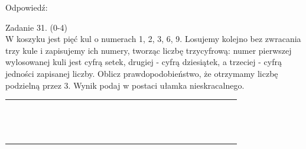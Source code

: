 \documentclass[10pt]{article}
\begin{document}
Odpowiedź:

Zadanie 31. (0-4)\\
W koszyku jest pięć kul o numerach 1, 2, 3, 6, 9. Losujemy kolejno bez zwracania trzy kule i zapisujemy ich numery, tworząc liczbę trzycyfrową: numer pierwszej wylosowanej kuli jest cyfrą setek, drugiej - cyfrą dziesiątek, a trzeciej - cyfrą jedności zapisanej liczby. Oblicz prawdopodobieństwo, że otrzymamy liczbę podzielną przez 3. Wynik podaj w postaci ułamka nieskracalnego.

\begin{center}
\begin{tabular}{|c|c|c|c|c|c|c|c|c|c|c|c|c|c|c|c|c|c|c|c|c|c|c|c|c|c|c|c|}
\hline
 &  &  &  &  &  &  &  &  &  &  &  &  &  &  &  &  &  &  &  &  &  &  &  &  &  &  &  \\
\hline
 &  &  &  &  &  &  &  &  &  &  &  &  &  &  &  &  &  &  &  &  &  &  &  &  &  &  &  \\
\hline
 &  &  &  &  &  &  &  &  &  &  &  &  &  &  &  &  &  &  &  &  &  &  &  &  &  &  &  \\
\hline
 &  &  &  &  &  &  &  &  &  &  &  &  &  &  &  &  &  &  &  &  &  &  &  &  &  &  &  \\
\hline
 &  &  &  &  &  &  &  &  &  &  &  &  &  &  &  &  &  &  &  &  &  &  &  &  &  &  &  \\
\hline
 &  &  &  &  &  &  &  &  &  &  &  &  &  &  &  &  &  &  &  &  &  &  &  &  &  &  &  \\
\hline
 &  &  &  &  &  &  &  &  &  &  &  &  &  &  &  &  &  &  &  &  &  &  &  &  &  &  &  \\
\hline
 &  &  &  &  &  &  &  &  &  &  &  &  &  &  &  &  &  &  &  &  &  &  &  &  &  &  &  \\
\hline
 &  &  &  &  &  &  &  &  &  &  &  &  &  &  &  &  &  &  &  &  &  &  &  &  &  &  &  \\
\hline
 &  &  &  &  &  &  &  &  &  &  &  &  &  &  &  &  &  &  &  &  &  &  &  &  &  &  &  \\
\hline
 &  &  &  &  &  &  &  &  &  &  &  &  &  &  &  &  &  &  &  &  &  &  &  &  &  &  &  \\
\hline
 &  &  &  &  &  &  &  &  &  &  &  &  &  &  &  &  &  &  &  &  &  &  &  &  &  &  &  \\
\hline
 &  &  &  &  &  &  &  &  &  &  &  &  &  &  &  &  &  &  &  &  &  &  &  &  &  &  &  \\
\hline
 &  &  &  &  &  &  &  &  &  &  &  &  &  &  &  &  &  &  &  &  &  &  &  &  &  &  &  \\
\hline
 &  &  &  &  &  &  &  &  &  &  &  &  &  &  &  &  &  &  &  &  &  &  &  &  &  &  &  \\

\end{tabular}
\end{center}
\end{document}
